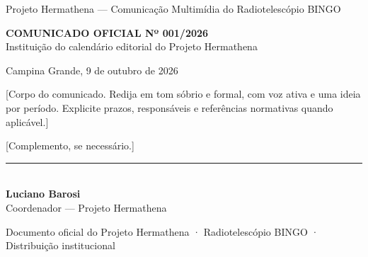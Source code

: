 \documentclass[11pt,a4paper]{article}
\newcommand{\comNumero}{001/2026}
\newcommand{\comLocalData}{Campina Grande, 9 de outubro de 2026}
\newcommand{\comTitulo}{Instituição do calendário editorial do Projeto Hermathena}
\newcommand{\comSignatario}{Luciano Barosi}
\newcommand{\comSignatarioCargo}{Coordenador — Projeto Hermathena}
\begin{document}
\begin{center}
  \hermathenaLogo[2.4cm]\par\vspace{6pt}
  {\hermaDisplay\color{hermaGrafite}\small Projeto Hermathena — Comunicação Multimídia do Radiotelescópio BINGO}\par\vspace{2pt}
  \hermaRule
\end{center}

\vspace{10pt}
\begin{center}
  {\hermaDisplay\color{hermaAzulProfundo}\Large\bfseries COMUNICADO OFICIAL Nº \comNumero}\\[4pt]
  {\hermaDisplay\color{hermaAzulBingo}\large \comTitulo}
\end{center}

\vspace{16pt}
\comLocalData

\vspace{14pt}
[Corpo do comunicado. Redija em tom sóbrio e formal, com voz ativa e uma ideia por
período. Explicite prazos, responsáveis e referências normativas quando
aplicável.]

\vspace{6pt}
[Complemento, se necessário.]

\vspace{26pt}
\begin{flushright}
  \rule{7cm}{0.4pt}\\
  \textbf{\comSignatario}\\
  \comSignatarioCargo
\end{flushright}

\vspace{18pt}
\hermaRule
\vspace{4pt}
{\footnotesize\color{hermaGrafite} Documento oficial do Projeto Hermathena ·
Radiotelescópio BINGO · Distribuição institucional}
\end{document}
